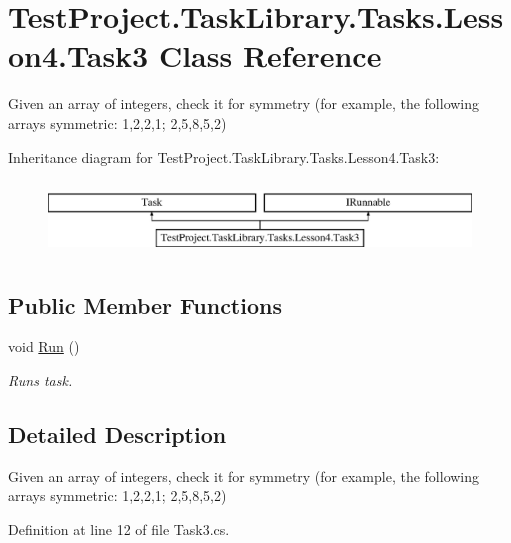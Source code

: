 \hypertarget{class_test_project_1_1_task_library_1_1_tasks_1_1_lesson4_1_1_task3}{}\section{Test\+Project.\+Task\+Library.\+Tasks.\+Lesson4.\+Task3 Class Reference}
\label{class_test_project_1_1_task_library_1_1_tasks_1_1_lesson4_1_1_task3}


Given an array of integers, check it for symmetry (for example, the following arrays symmetric\+: 1,2,2,1; 2,5,8,5,2)  


Inheritance diagram for Test\+Project.\+Task\+Library.\+Tasks.\+Lesson4.\+Task3\+:\begin{figure}[H]
\begin{center}
\leavevmode
\includegraphics[height=2.000000cm]{class_test_project_1_1_task_library_1_1_tasks_1_1_lesson4_1_1_task3}
\end{center}
\end{figure}
\subsection*{Public Member Functions}
\begin{DoxyCompactItemize}
\item 
void \mbox{\hyperlink{class_test_project_1_1_task_library_1_1_tasks_1_1_lesson4_1_1_task3_a4e1d1771c389611e885a482edf2a310f}{Run}} ()
\begin{DoxyCompactList}\small\item\em Runs task. \end{DoxyCompactList}\end{DoxyCompactItemize}


\subsection{Detailed Description}
Given an array of integers, check it for symmetry (for example, the following arrays symmetric\+: 1,2,2,1; 2,5,8,5,2) 



Definition at line 12 of file Task3.\+cs.



